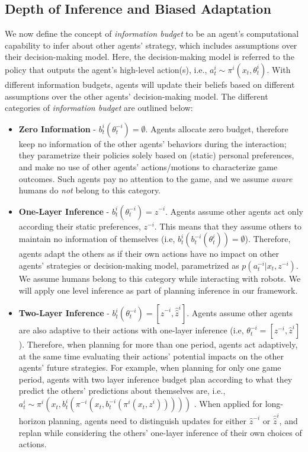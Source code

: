 \documentclass[letterpaper, 10 pt, conference]{ieeeconf}  %
\begin{document}
\subsection{Depth of Inference and Biased Adaptation}
We now define the concept of \textit{information budget} to be an agent's 
computational capability to infer about other agents' strategy, 
which includes assumptions over their decision-making model. Here, the 
decision-making model is referred to the policy that outputs 
the agent's high-level action(s), i.e., 
$a^i_{t} \sim \pi^i(x_t,\theta^i_t)$. With different information budgets, 
agents will update their beliefs based on different assumptions over the 
other agents' decision-making model. The different categories of \textit{information budget} are outlined below:

\begin{itemize}
	\item \textbf{Zero Information} - $b^i_t(\theta^{-i}_t) = \emptyset$. Agents allocate zero budget, therefore keep no information of the other agents' behaviors during the interaction; they 
    parametrize their policies solely based on (static) personal preferences, and make no use of other agents' actions/motions to characterize game outcomes. Such agents pay no attention to the game, and we assume \textit{aware} humans do \textit{not} belong to this category.
	\item \textbf{One-Layer Inference} - $b^i_t(\theta^{-i}_t) = \hat{z}^{-i}$. 
    Agents assume other agents act only according their static 
    preferences, $z^{-i}$. This means that they assume others to maintain no information of themselves (i.e, $b^i_t(b^{-i}_t(\theta^i_t))=\emptyset$).  
    Therefore, agents adapt the others as if their own actions have no 
    impact on other agents' strategies or decision-making model, parametrized 
    as 
    $p(a^{-i}_{t}|x_t, z^{-i})$. We assume humans belong to this 
    category while interacting with robots. We will apply one level inference as part of planning inference in our framework.
	\item \textbf{Two-Layer Inference} - $b^i_t(\theta^{-i}_t) = [\hat{z}^{-i}, \hat{\hat{z}}^i]$. Agents assume other agents are also adaptive to their actions with one-layer inference (i.e,
	$\theta^{-i}_t = [z^{-i}, \hat{z}^{i}]$). 
    Therefore, when planning for more than one period, agents act adaptively, 
    at the same time evaluating their actions' potential impacts on the 
    other agents' future strategies. For example, when planning for only one game period, 
    agents with two layer inference budget plan according to 
    what they 
    predict the others' predictions about themselves are, i.e.,
    $a^i_t \sim \pi^i(x_t, b^i_t(\pi^{-i}(x_t,b^{-i}_t(\pi^i(x_t,{z}^i)))))$
    . When applied for long-horizon planning, agents need to distinguish 
    updates for either $\hat{z}^{-i}$ or $\hat{\hat{z}}^i$, and replan while 
    considering the others' one-layer inference of their own choices of 
    actions. 
    

\end{itemize}
\end{document}

